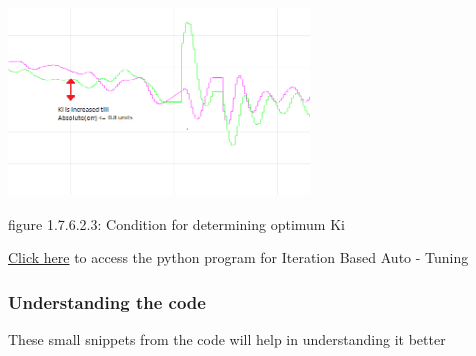 \documentclass[a4paper,12pt,oneside]{book}
\begin{document}
\includegraphics[width = 8cm , height= 5cm]{Autotune_iteration_1_e2.png}
\begin{center}
    figure 1.7.6.2.3: Condition for determining optimum Ki
\end{center}


\href{https://github.com/eYSIP-2018/Autotuning-of-Controller-For-Drone/blob/Amit-Kumar/Auto_Tuning.py}{Click here} to access the python program for Iteration Based Auto - Tuning\\


\subsubsection{Understanding the code }

These small snippets from the code will help in understanding it better
\end{document}
